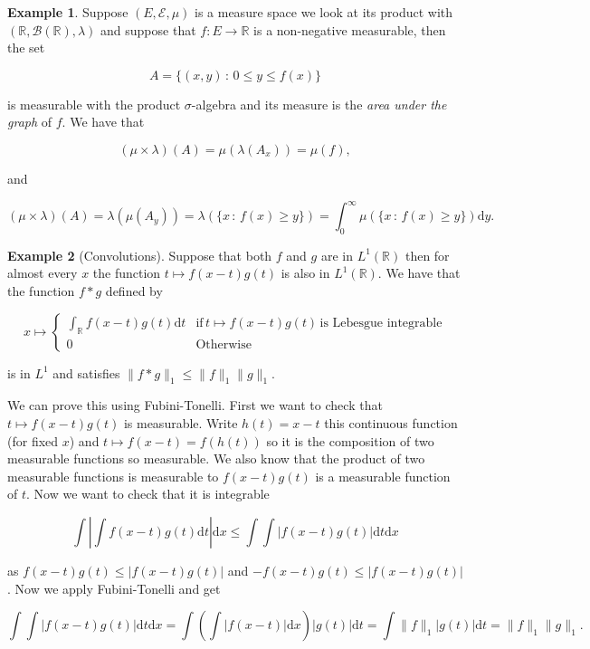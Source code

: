 \documentclass[
]{book}
\theoremstyle{definition}
\theoremstyle{definition}
\newtheorem{example}{Example}[chapter]
\theoremstyle{definition}
\theoremstyle{definition}
\theoremstyle{remark}
\begin{document}
\begin{example}
Suppose \((E, \mathcal{E}, \mu)\) is a measure space we look at its product with \((\mathbb{R}, \mathcal{B}(\mathbb{R}), \lambda)\) and suppose that \(f:E \rightarrow \mathbb{R}\) is a non-negative measurable, then the set

\[ A = \{(x,y) \,:\, 0 \leq y \leq f(x) \} \]

is measurable with the product \(\sigma\)-algebra and its measure is the \emph{area under the graph} of \(f\). We have that

\[ (\mu \times \lambda)(A) = \mu( \lambda(A_x)) = \mu(f),  \]

and

\[ (\mu \times \lambda)(A) = \lambda( \mu(A_y)) = \lambda (\{ x \,:\, f(x) \geq y \}) = \int_0^ \infty \mu(\{x \,:\, f(x) \geq y\}) \mathrm{d}y. \]
\end{example}

\begin{example}[Convolutions]
Suppose that both \(f\) and \(g\) are in \(L^1(\mathbb{R})\) then for almost every \(x\) the function \(t \mapsto f(x-t) g(t)\) is also in \(L^1(\mathbb{R})\). We have that the function \(f*g\) defined by

\[x \mapsto \left\{ \begin{array}{ll} \int_{\mathbb{R}} f(x-t)g(t) \mathrm{d}t & \mbox{if}\, t \mapsto f(x-t)g(t)\, \mbox{is Lebesgue integrable} \\
0 & \mbox{Otherwise} \end{array}\right. \]

is in \(L^1\) and satisfies \(\|f*g\|_1 \leq \|f\|_1 \|g\|_1\).

We can prove this using Fubini-Tonelli. First we want to check that \(t \mapsto f(x-t)g(t)\) is measurable. Write \(h(t) = x-t\) this continuous function (for fixed \(x\)) and \(t \mapsto f(x-t) = f(h(t))\) so it is the composition of two measurable functions so measurable. We also know that the product of two measurable functions is measurable to \(f(x-t)g(t)\) is a measurable function of \(t\). Now we want to check that it is integrable

\[ \int \left| \int f(x-t)g(t) \mathrm{d}t \right| \mathrm{d}x \leq \int \int |f(x-t)g(t)| \mathrm{d}t \mathrm{d}x \]

as \(f(x-t)g(t) \leq |f(x-t)g(t)|\) and \(-f(x-t)g(t) \leq |f(x-t)g(t)|\). Now we apply Fubini-Tonelli and get

\[ \int \int |f(x-t)g(t)| \mathrm{d}t \mathrm{d}x = \int \left( \int |f(x-t)| \mathrm{d}x\right) |g(t)| \mathrm{d}t = \int \|f\|_1 |g(t)| \mathrm{d}t = \|f\|_1 \|g\|_1. \]
\end{example}
\end{document}
